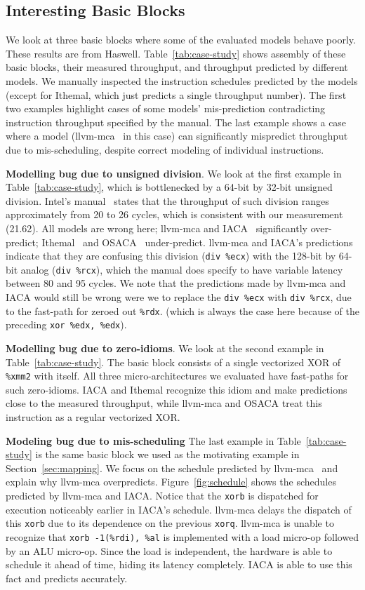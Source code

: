 \subsection{Interesting Basic Blocks}
We look at three basic blocks where some of the evaluated models behave poorly.
These results are from Haswell.
Table~\ref{tab:case-study} shows assembly of these basic blocks, their 
measured throughput, and throughput predicted by different models.
We manually inspected the instruction schedules predicted by the models
(except for Ithemal, which just predicts a single throughput number).
The first two examples highlight cases of some models' mis-prediction
contradicting instruction throughput specified by the manual.
The last example shows a case where a model (llvm-mca~\cite{llvm-mca} in this case) can significantly
mispredict throughput due to mis-scheduling, despite correct modeling of individual instructions.

\textbf{Modelling bug due to unsigned division}.
We look at the first example in Table~\ref{tab:case-study},
which is bottlenecked by a 64-bit by 32-bit unsigned division.
Intel's manual~\cite{intel-manual} states that the throughput of such division
ranges approximately from 20 to 26 cycles, which is consistent with our measurement (21.62).
All models are wrong here; llvm-mca and IACA~\cite{iaca} significantly over-predict;
Ithemal~\cite{ithemal} and OSACA~\cite{osaca} under-predict.
llvm-mca and IACA's predictions indicate that they are confusing 
this division (\verb|div %ecx|) with the 128-bit by 64-bit analog (\verb|div %rcx|),
which the manual does specify to have variable latency between 80 and 95 cycles.
We note that the predictions made by llvm-mca and IACA would still be wrong
were we to replace the \verb|div %ecx| with \verb|div %rcx|,
due to the fast-path for zeroed out \verb|%rdx|.
(which is always the case here because of the preceding \verb|xor %edx, %edx|).

\textbf{Modelling bug due to zero-idioms}.
We look at the second example in Table~\ref{tab:case-study}.
The basic block consists of a single vectorized XOR of \verb|%xmm2| with itself.
All three micro-architectures we evaluated have fast-paths for such zero-idioms. 
IACA and Ithemal recognize this idiom and make predictions close to the measured throughput,
while llvm-mca and OSACA treat this instruction as a regular vectorized XOR.

\textbf{Modeling bug due to mis-scheduling}
The last example in Table~\ref{tab:case-study} is the same basic block
we used as the motivating example in Section~\ref{sec:mapping}.
We focus on the schedule predicted by llvm-mca~\cite{llvm-mca}
and explain why llvm-mca overpredicts.
Figure~\ref{fig:schedule} shows the schedules predicted by llvm-mca and IACA.
Notice that the \verb|xorb| is dispatched for execution noticeably earlier in IACA's schedule.
llvm-mca delays the dispatch of this \verb|xorb| due to its dependence on the previous \verb|xorq|.
llvm-mca is unable to recognize that 
\verb|xorb -1(%rdi), %al| is implemented with a load micro-op followed by an ALU micro-op.
Since the load is independent, the hardware is able to schedule it ahead of time,
hiding its latency completely.
IACA is able to use this fact and predicts accurately.

